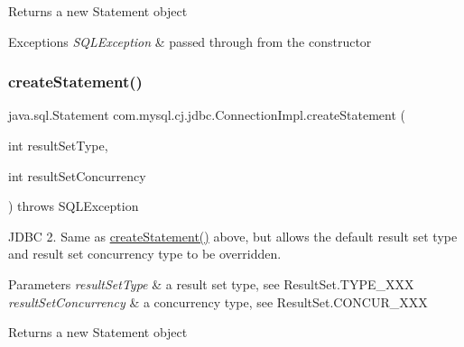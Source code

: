\begin{DoxyReturn}{Returns}
a new Statement object 
\end{DoxyReturn}

\begin{DoxyExceptions}{Exceptions}
{\em S\+Q\+L\+Exception} & passed through from the constructor \\
\hline
\end{DoxyExceptions}
\mbox{\label{classcom_1_1mysql_1_1cj_1_1jdbc_1_1_connection_impl_a0d60b523a6d4c9b50523770c41b9ed3a}} 
\subsubsection{\texorpdfstring{create\+Statement()}{createStatement()}\hspace{0.1cm}{\footnotesize\ttfamily [2/2]}}
{\footnotesize\ttfamily java.\+sql.\+Statement com.\+mysql.\+cj.\+jdbc.\+Connection\+Impl.\+create\+Statement (\begin{DoxyParamCaption}\item[{int}]{result\+Set\+Type,  }\item[{int}]{result\+Set\+Concurrency }\end{DoxyParamCaption}) throws S\+Q\+L\+Exception}

J\+D\+BC 2. Same as \mbox{\hyperlink{classcom_1_1mysql_1_1cj_1_1jdbc_1_1_connection_impl_ac07000b85a6e8197ac8ca945bc44bbec}{create\+Statement()}} above, but allows the default result set type and result set concurrency type to be overridden.


\begin{DoxyParams}{Parameters}
{\em result\+Set\+Type} & a result set type, see Result\+Set.\+T\+Y\+P\+E\+\_\+\+X\+XX \\
\hline
{\em result\+Set\+Concurrency} & a concurrency type, see Result\+Set.\+C\+O\+N\+C\+U\+R\+\_\+\+X\+XX \\
\hline
\end{DoxyParams}
\begin{DoxyReturn}{Returns}
a new Statement object 
\end{DoxyReturn}


